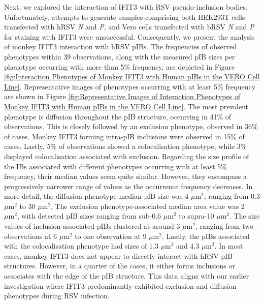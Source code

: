 Next, we explored the interaction of IFIT3 with RSV pseudo-inclusion bodies. Unfortunately, attempts to generate samples comprising both HEK293T cells transfected with hRSV \textit{N} and \textit{P}, and Vero cells transfected with bRSV \textit{N} and \textit{P} for staining with IFIT3 were unsuccessful. Consequently, we present the analysis of monkey IFIT3 interaction with hRSV pIBs. The frequencies of observed phenotypes within 39 observations, along with the measured pIB sizes per phenotype occurring with more than 5\% frequency, are depicted in Figure \ref{fig:Interaction Phenotypes of Monkey IFIT3 with Human pIBs in the VERO Cell Line}. Representative images of phenotypes occurring with at least 5\% frequency are shown in Figure \ref{fig:Representative Images of Interaction Phenotypes of Monkey IFIT3 with Human pIBs in the VERO Cell Line}. The most prevalent phenotype is diffusion throughout the pIB structure, occurring in 41\% of observations. This is closely followed by an exclusion phenotype, observed in 36\% of cases. Monkey IFIT3 forming intra-pIB inclusions were observed in 15\% of cases. Lastly, 5\% of observations showed a colocalisation phenotype, while 3\% displayed colocalisation associated with exclusion. Regarding the size profile of the IBs associated with different phenotypes occurring with at least 5\% frequency, their median values seem quite similar. However, they encompass a progressively narrower range of values as the occurrence frequency decreases. In more detail, the diffusion phenotype median pIB size was 4 \(\mu \mbox{m}^2\), ranging from 0.3 \(\mu \mbox{m}^2\) to 30 \(\mu \mbox{m}^2\). The exclusion phenotype-associated median area value was 2 \(\mu \mbox{m}^2\), with detected pIB sizes ranging from sub-0.6 \(\mu \mbox{m}^2\) to supra-10 \(\mu \mbox{m}^2\). The size values of inclusion-associated pIBs clustered at around 3 \(\mu \mbox{m}^2\), ranging from two observations at 6 \(\mu \mbox{m}^2\) to one observation at 9 \(\mu \mbox{m}^2\). Lastly, the pIBs associated with the colocalisation phenotype had sizes of 1.3 \(\mu \mbox{m}^2\) and 4.3 \(\mu \mbox{m}^2\). In most cases, monkey IFIT3 does not appear to directly interact with hRSV pIB structures. However, in a quarter of the cases, it either forms inclusions or associates with the edge of the pIB structure. This data aligns with our earlier investigation where IFIT3 predominantly exhibited exclusion and diffusion phenotypes during RSV infection.

